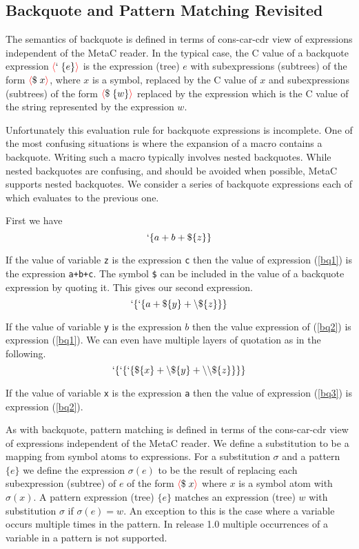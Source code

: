 \documentclass{article}
\newcommand{\fopen}{{\color{red} \langle}}
\newcommand{\fclose}{{\color{red} \rangle}}
\begin{document}
\subsection{Backquote and Pattern Matching Revisited}

The semantics of backquote is defined in terms of cons-car-cdr view of expressions independent of the MetaC reader.
In the typical case, the C value of a backquote expression
$\fopen ` \;\{e\}\fclose$ is the expression (tree) $e$ with subexpressions (subtrees) of the form $\fopen \$\;x \fclose$, where $x$ is a symbol,
replaced by the C value of $x$
and subexpressions (subtrees) of the form $\fopen \$\;\{w\}\fclose$ replaced by the expression which is the C value of the string represented by the expression $w$.

Unfortunately this evaluation rule for backquote expressions is incomplete.  One of the most
confusing situations is where the expansion of a macro contains a backquote.  Writing such a macro typically involves nested backquotes.  While nested backquotes
are confusing, and should be avoided when possible, MetaC supports nested backquotes.  We consider a series of backquote expressions each of which evaluates to the previous one.

First we have
\begin{equation}
\label{bq1}
`\{a+b+\$\{z\}\}
\end{equation}

If the value of variable {\tt z} is the expression {\tt c} then the value of expression (\ref{bq1}) is the expression {\tt a+b+c}.
The symbol {\tt \$} can be included in the value of a backquote expression by quoting it.  This gives our second expression.
\begin{equation}
\label{bq2}
`\{`\{a + \$\{y\} + \backslash\$\{z\}\}\}
\end{equation}

If the value of variable {\tt y} is the expression $b$ then the value expression of (\ref{bq2}) is expression (\ref{bq1}).
We can even have multiple layers of quotation as in the following.
\begin{equation}
\label{bq3}
`\{`\{`\{\$\{x\} + \backslash\$\{y\} + \backslash\backslash\$\{z\}\}\}\}
\end{equation}

If the value of variable {\tt x} is the expression {\tt a} then the value of expression (\ref{bq3}) is expression (\ref{bq2}).

As with backquote, pattern matching is defined in terms of the cons-car-cdr view of expressions independent of the MetaC reader.  We define a substitution to be a mapping from
symbol atoms to expressions. For a substitution $\sigma$ and a pattern $\{e\}$ we define the expression $\sigma(e)$
to be the result of replacing each subexpression (subtree) of $e$ of the form $\fopen \$\;x \fclose$ where $x$ is a symbol atom with $\sigma(x)$.  A pattern expression (tree) $\{e\}$ matches an expression (tree) $w$ with substitution $\sigma$
if $\sigma(e) = w$. An exception to this is the case where a variable occurs multiple times in the pattern.  In release 1.0 multiple occurrences of a variable in a pattern is not supported.
\end{document}
